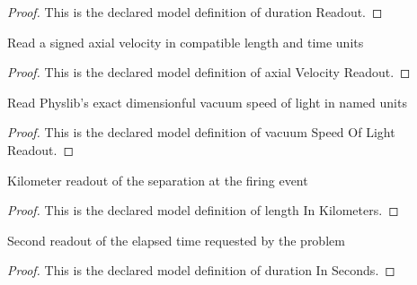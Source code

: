 \begin{proof}
  This is the declared model definition of duration Readout.
\end{proof}
\begin{definition}
  \label{def:physics:phyx-mini-0607:phyxminiproblems-problemphyxmini0607-axialvelocityreadout}
  Read a signed axial velocity in compatible length and time units
\end{definition}
\begin{proof}
  This is the declared model definition of axial Velocity Readout.
\end{proof}
\begin{definition}
  \label{def:physics:phyx-mini-0607:phyxminiproblems-problemphyxmini0607-vacuumspeedoflightreadout}
  Read Physlib's exact dimensionful vacuum speed of light in named units
\end{definition}
\begin{proof}
  This is the declared model definition of vacuum Speed Of Light Readout.
\end{proof}
\begin{definition}
  \label{def:physics:phyx-mini-0607:phyxminiproblems-problemphyxmini0607-lengthinkilometers}
  Kilometer readout of the separation at the firing event
\end{definition}
\begin{proof}
  This is the declared model definition of length In Kilometers.
\end{proof}
\begin{definition}
  \label{def:physics:phyx-mini-0607:phyxminiproblems-problemphyxmini0607-durationinseconds}
  Second readout of the elapsed time requested by the problem
\end{definition}
\begin{proof}
  This is the declared model definition of duration In Seconds.
\end{proof}
